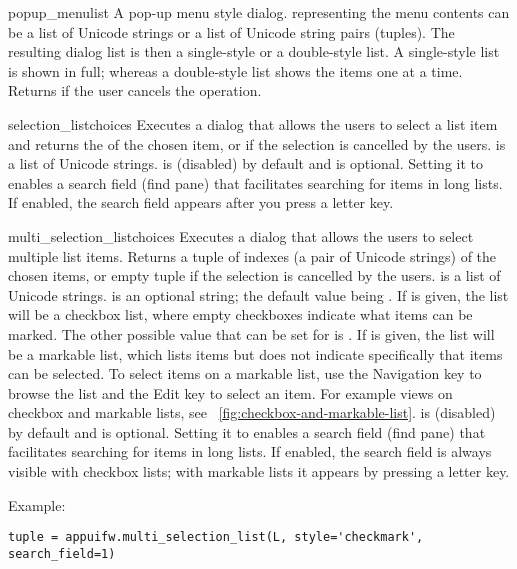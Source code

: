 \begin{funcdesc}{popup_menu}{list}
A pop-up menu style dialog.  representing the menu 
contents can be a list of Unicode strings or a list of Unicode string pairs 
(tuples). The resulting dialog list is then a single-style or a double-style 
list. A single-style list is shown in full; whereas a double-style list 
shows the items one at a time. Returns  if the user cancels the 
operation.
\end{funcdesc}

\begin{funcdesc}{selection_list}{choices}
Executes a dialog that allows the users to select a list item and
returns the  of the chosen item, or  if the
selection is cancelled by the users.  is a list of
Unicode strings.
 is  (disabled) by default and is optional. Setting it to  enables a search field (find pane) that facilitates searching for items in long lists. If enabled, the search field appears after you press a letter key.
\end{funcdesc}

\begin{funcdesc}{multi_selection_list}{choices}
  Executes a dialog that allows the users to select multiple list
  items.  Returns a tuple of indexes (a pair of Unicode strings) of
  the chosen items, or empty tuple if the selection is cancelled by
  the users.  is a list of Unicode strings.  
  is an optional string; the default value being .
  If  is given, the list will be a checkbox list,
  where empty checkboxes indicate what items can be marked. The other
  possible value that can be set for  is
  . If  is given, the list will be
  a markable list, which lists items but does not indicate
  specifically that items can be selected. To select items on a
  markable list, use the Navigation key to browse the list and the
  Edit key to select an item. For example views on checkbox and
  markable lists, see
  \figurename~\ref{fig:checkbox-and-markable-list}.
   is  (disabled) by default and is
  optional. Setting it to  enables a search field (find pane)
  that facilitates searching for items in long lists. If enabled, the
  search field is always visible with checkbox lists; with markable
  lists it appears by pressing a letter key.

Example:
\begin{verbatim}
tuple = appuifw.multi_selection_list(L, style='checkmark', search_field=1)
\end{verbatim}
\end{funcdesc}

